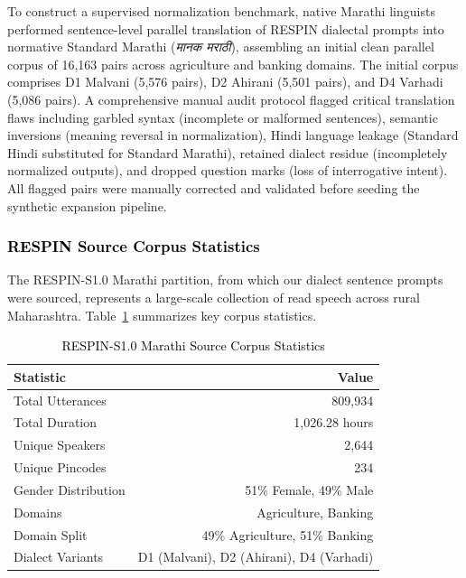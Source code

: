 To construct a supervised normalization benchmark, native Marathi linguists performed sentence-level parallel translation of RESPIN dialectal prompts into normative Standard Marathi (\emph{मानक मराठी}), assembling an initial clean parallel corpus of 16,163 pairs across agriculture and banking domains. The initial corpus comprises D1 Malvani (5,576 pairs), D2 Ahirani (5,501 pairs), and D4 Varhadi (5,086 pairs). A comprehensive manual audit protocol flagged critical translation flaws including garbled syntax (incomplete or malformed sentences), semantic inversions (meaning reversal in normalization), Hindi language leakage (Standard Hindi substituted for Standard Marathi), retained dialect residue (incompletely normalized outputs), and dropped question marks (loss of interrogative intent). All flagged pairs were manually corrected and validated before seeding the synthetic expansion pipeline.

\subsubsection{\textcolor{black}{RESPIN Source Corpus Statistics}}

The RESPIN-S1.0 Marathi partition, from which our dialect sentence prompts were sourced, represents a large-scale collection of read speech across rural Maharashtra. Table~\ref{tab:respin_stats} summarizes key corpus statistics.

\begin{table}[t]
\color{black}
\centering
\caption{\textcolor{black}{RESPIN-S1.0 Marathi Source Corpus Statistics}}
\label{tab:respin_stats}
\begin{tabular}{lr}
\hline
\textbf{Statistic} & \textbf{Value} \\
\hline
Total Utterances & 809,934 \\
Total Duration & 1,026.28 hours \\
Unique Speakers & 2,644 \\
Unique Pincodes & 234 \\
Gender Distribution & 51\% Female, 49\% Male \\
Domains & Agriculture, Banking \\
Domain Split & 49\% Agriculture, 51\% Banking \\
Dialect Variants & D1 (Malvani), D2 (Ahirani), D4 (Varhadi) \\
\hline
\end{tabular}
\end{table}

